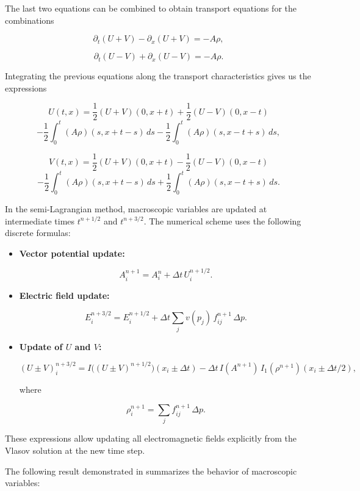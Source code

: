\documentclass[11pt,a4paper,twoside,pdf]{article}
\numberwithin{equation}{section}
\begin{document}
The last two equations can be combined to obtain transport equations for the combinations




\[
\partial_t(U+V) - \partial_x(U+V) = -A\rho,
\]




\[
\partial_t(U-V) + \partial_x(U-V) = -A\rho.
\]




Integrating the previous equations along the transport characteristics gives us the expressions


\[
U(t,x) = \frac{1}{2}(U+V)(0,x+t) + \frac{1}{2}(U-V)(0,x-t)
\]
\[
- \frac{1}{2}\int_0^t (A\rho)(s,x+t-s)\,ds
- \frac{1}{2}\int_0^t (A\rho)(s,x-t+s)\,ds,
\]




\[
V(t,x) = \frac{1}{2}(U+V)(0,x+t) - \frac{1}{2}(U-V)(0,x-t)
\]
\[
- \frac{1}{2}\int_0^t (A\rho)(s,x+t-s)\,ds
+ \frac{1}{2}\int_0^t (A\rho)(s,x-t+s)\,ds.
\]




In the semi-Lagrangian method, macroscopic variables are updated at intermediate times $t^{n+1/2}$ and $t^{n+3/2}$. The numerical scheme uses the following discrete formulas:

\begin{itemize}
\item \textbf{Vector potential update:}


\[
A^{n+1}_i = A^n_i + \Delta t\,U^{n+1/2}_i.
\]



\item \textbf{Electric field update:}


\[
E^{n+3/2}_i = E^{n+1/2}_i + \Delta t\sum_j v(p_j)\,f^{n+1}_{ij}\,\Delta p.
\]



\item \textbf{Update of $U$ and $V$:}


\[
(U\pm V)^{n+3/2}_i =
I\big((U\pm V)^{n+1/2}\big)(x_i\pm\Delta t)
-\Delta t\,I(A^{n+1})\,I_1(\rho^{n+1})(x_i\pm\Delta t/2),
\]


where


\[
\rho^{n+1}_i = \sum_j f^{n+1}_{ij}\,\Delta p.
\]


\end{itemize}

These expressions allow updating all electromagnetic fields explicitly from the Vlasov solution at the new time step.


The following result demonstrated in \cite{bostan2009convergence} summarizes the behavior of macroscopic variables:
\end{document}
